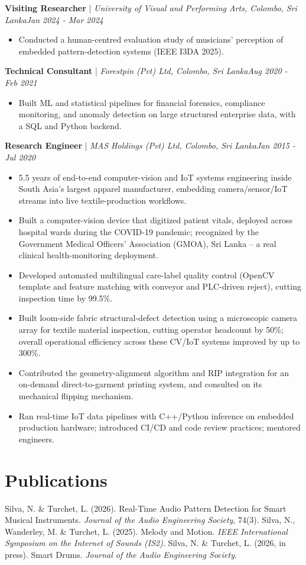 \documentclass[11pt]{article}
\newenvironment{cvrole}[5]{%
  \par\noindent\textbf{\large #1} | \textit{\small #2, #3}\hfill \textit{\small #4 - #5}\par
  \begin{itemize}[leftmargin=2em, itemsep=-0.3em, topsep=-0.5em]%
}{%
  \end{itemize}\par\noindent\mbox{}\par\vspace{0.1em}%
}
\begin{document}
\begin{cvrole}{Visiting Researcher}{University of Visual and Performing Arts}{Colombo, Sri Lanka}{Jan 2024}{Mar 2024}
  \item Conducted a human-centred evaluation study of musicians' perception of embedded pattern-detection systems (IEEE I3DA 2025).
\end{cvrole}
\begin{cvrole}{Technical Consultant}{Forestpin (Pvt) Ltd}{Colombo, Sri Lanka}{Aug 2020}{Feb 2021}
  \item Built ML and statistical pipelines for financial forensics, compliance monitoring, and anomaly detection on large structured enterprise data, with a SQL and Python backend.
\end{cvrole}
\begin{cvrole}{Research Engineer}{MAS Holdings (Pvt) Ltd}{Colombo, Sri Lanka}{Jan 2015}{Jul 2020}
  \item 5.5 years of end-to-end computer-vision and IoT systems engineering inside South Asia's largest apparel manufacturer, embedding camera/sensor/IoT streams into live textile-production workflows.
  \item Built a computer-vision device that digitized patient vitals, deployed across hospital wards during the COVID-19 pandemic; recognized by the Government Medical Officers' Association (GMOA), Sri Lanka -- a real clinical health-monitoring deployment.
  \item Developed automated multilingual care-label quality control (OpenCV template and feature matching with conveyor and PLC-driven reject), cutting inspection time by 99.5\%.
  \item Built loom-side fabric structural-defect detection using a microscopic camera array for textile material inspection, cutting operator headcount by 50\%; overall operational efficiency across these CV/IoT systems improved by up to 300\%.
  \item Contributed the geometry-alignment algorithm and RIP integration for an on-demand direct-to-garment printing system, and consulted on its mechanical flipping mechanism.
  \item Ran real-time IoT data pipelines with C++/Python inference on embedded production hardware; introduced CI/CD and code review practices; mentored engineers.
\end{cvrole}

\section*{Publications}
Silva, N. \& Turchet, L. (2026). Real-Time Audio Pattern Detection for Smart Musical Instruments. \textit{Journal of the Audio Engineering Society}, 74(3). Silva, N., Wanderley, M. \& Turchet, L. (2025). Melody and Motion. \textit{IEEE International Symposium on the Internet of Sounds (IS2)}. Silva, N. \& Turchet, L. (2026, in press). Smart Drums. \textit{Journal of the Audio Engineering Society}.
\end{document}
